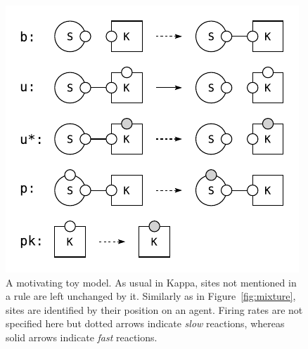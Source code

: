 \begin{figure}[!h]
  \vskip -0.2cm
  \begin{center}
    \includegraphics[scale=0.9]{figures/model.pdf}
  \end{center}
  \vskip -0.2cm
  \caption{A motivating toy model. As usual in Kappa, sites not
    mentioned in a rule are left unchanged by it. Similarly as in
    Figure~\protect\ref{fig:mixture}, sites are identified by their
    position on an agent.  Firing rates are not specified here but
    dotted arrows indicate \textit{slow} reactions, whereas solid
    arrows indicate \textit{fast} reactions.}
  \label{fig:model}
\end{figure}
